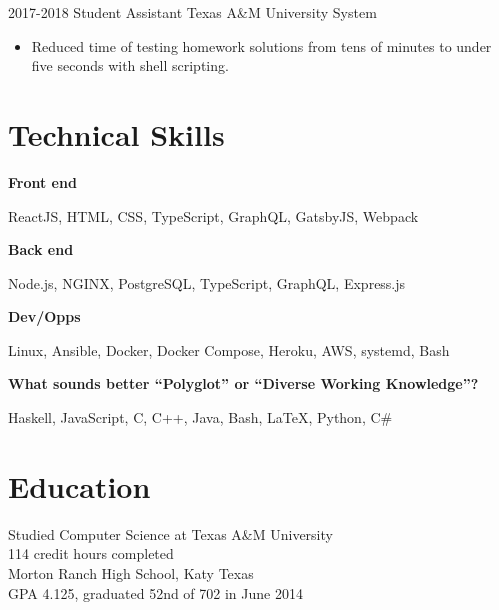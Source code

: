 \documentclass{resume}
\begin{document}
\entry
{2017-2018}
{Student Assistant}
{Texas A\&M University System}
{
    \begin{itemize}
        \item Reduced time of testing homework solutions from tens of minutes to
              under five seconds with shell scripting.
    \end{itemize}
}

\section{Technical Skills}

\begin{center}
    \textbf{Front end}

    ReactJS, HTML, CSS, TypeScript, GraphQL, GatsbyJS, Webpack

    \textbf{Back end}

    Node.js, NGINX, PostgreSQL, TypeScript, GraphQL, Express.js

    \textbf{Dev/Opps}

    Linux, Ansible, Docker, Docker Compose, Heroku, AWS, systemd, Bash

    \textbf{What sounds better ``Polyglot'' or ``Diverse Working Knowledge''?}

    Haskell, JavaScript, C, C++, Java, Bash, LaTeX, Python, C\#
\end{center}

\section{Education}

\noindent
Studied Computer Science at Texas A\&M University\\
114 credit hours completed\\[1em]
Morton Ranch High School, Katy Texas\\
GPA 4.125, graduated 52nd of 702 in June 2014
\end{document}
